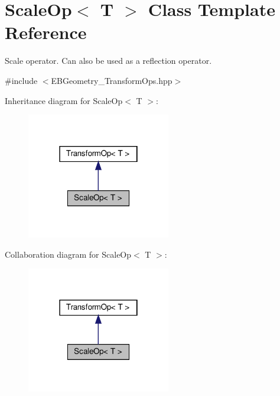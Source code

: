\hypertarget{classScaleOp}{}\section{Scale\+Op$<$ T $>$ Class Template Reference}
\label{classScaleOp}


Scale operator. Can also be used as a reflection operator.  




{\ttfamily \#include $<$E\+B\+Geometry\+\_\+\+Transform\+Ops.\+hpp$>$}



Inheritance diagram for Scale\+Op$<$ T $>$\+:\nopagebreak
\begin{figure}[H]
\begin{center}
\leavevmode
\includegraphics[width=178pt]{classScaleOp__inherit__graph}
\end{center}
\end{figure}


Collaboration diagram for Scale\+Op$<$ T $>$\+:\nopagebreak
\begin{figure}[H]
\begin{center}
\leavevmode
\includegraphics[width=178pt]{classScaleOp__coll__graph}
\end{center}
\end{figure}
